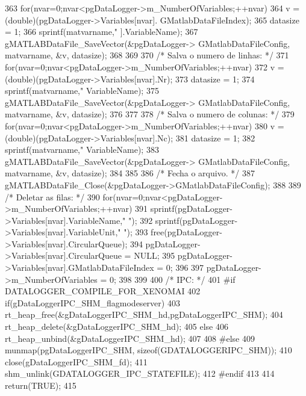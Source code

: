 \begin{DoxyCode}
{{363                 for(nvar=0;nvar<pgDataLogger->m_NumberOfVariables;++nvar){
364                         v = (double)(pgDataLogger->Variables[nvar].
      GMatlabDataFileIndex);
365                         datasize = 1;
366                         sprintf(matvarname,"%
      ].VariableName);
367                         gMATLABDataFile_SaveVector(&pgDataLogger->
      GMatlabDataFileConfig, matvarname, &v, datasize);
368                 }
369 
370                 /* Salva o numero de linhas: */
371                 for(nvar=0;nvar<pgDataLogger->m_NumberOfVariables;++nvar){
372                         v = (double)(pgDataLogger->Variables[nvar].Nr);
373                         datasize = 1;
374                         sprintf(matvarname,"%
      VariableName);
375                         gMATLABDataFile_SaveVector(&pgDataLogger->
      GMatlabDataFileConfig, matvarname, &v, datasize);
376                 }
377 
378                 /* Salva o numero de colunas: */
379                 for(nvar=0;nvar<pgDataLogger->m_NumberOfVariables;++nvar){
380                         v = (double)(pgDataLogger->Variables[nvar].Nc);
381                         datasize = 1;
382                         sprintf(matvarname,"%
      VariableName);
383                         gMATLABDataFile_SaveVector(&pgDataLogger->
      GMatlabDataFileConfig, matvarname, &v, datasize);
384                 }
385 
386                 /* Fecha o arquivo. */
387                 gMATLABDataFile_Close(&pgDataLogger->GMatlabDataFileConfig);
388 
389                 /* Deletar as filas: */
390                 for(nvar=0;nvar<pgDataLogger->m_NumberOfVariables;++nvar){
391                         sprintf(pgDataLogger->Variables[nvar].VariableName," ");
392                         sprintf(pgDataLogger->Variables[nvar].VariableUnit," ");
393                         free(pgDataLogger->Variables[nvar].CircularQueue);
394                         pgDataLogger->Variables[nvar].CircularQueue = NULL;
395                         pgDataLogger->Variables[nvar].GMatlabDataFileIndex = 0;
396                 }
397                 pgDataLogger->m_NumberOfVariables = 0;
398         }
399         
400         /* IPC: */
401 #if DATALOGGER_COMPILE_FOR_XENOMAI
402         if(gDataLoggerIPC_SHM_flagmodeserver){
403                 rt_heap_free(&gDataLoggerIPC_SHM_hd,pgDataLoggerIPC_SHM);
404                 rt_heap_delete(&gDataLoggerIPC_SHM_hd);
405         } else{
406                 rt_heap_unbind(&gDataLoggerIPC_SHM_hd);
407         }
408 #else
409         munmap(pgDataLoggerIPC_SHM, sizeof(GDATALOGGERIPC_SHM));
410         close(gDataLoggerIPC_SHM_fd);
411         shm_unlink(GDATALOGGER_IPC_STATEFILE);
412 #endif
413         
414         return(TRUE);
415 }
\end{DoxyCode}
